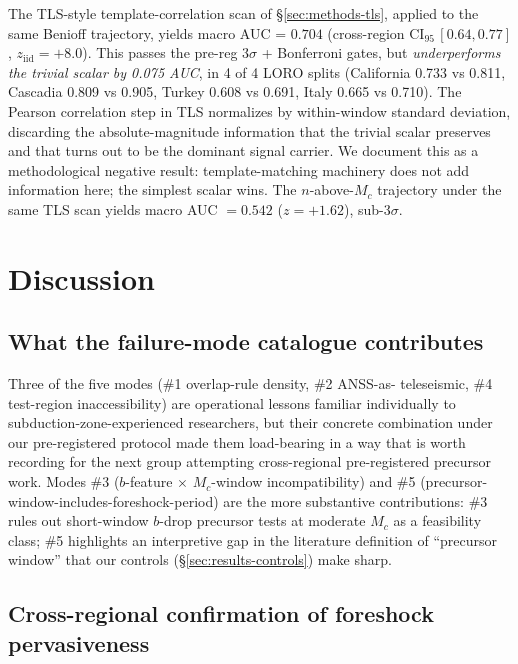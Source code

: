 \documentclass[11pt]{article}
\begin{document}
The TLS-style template-correlation scan of \S\ref{sec:methods-tls},
applied to the same Benioff trajectory, yields macro AUC = $0.704$
(cross-region $\mathrm{CI}_{95}\,[0.64, 0.77]$, $z_\mathrm{iid} =
+8.0$). This passes the pre-reg 3$\sigma$ + Bonferroni gates, but
\emph{underperforms the trivial scalar by 0.075 AUC}, in 4 of 4 LORO
splits (California 0.733 vs 0.811, Cascadia 0.809 vs 0.905, Turkey
0.608 vs 0.691, Italy 0.665 vs 0.710). The Pearson correlation step in
TLS normalizes by within-window standard deviation, discarding the
absolute-magnitude information that the trivial scalar preserves and
that turns out to be the dominant signal carrier. We document this as
a methodological negative result: template-matching machinery does not
add information here; the simplest scalar wins. The
$n$-above-$M_c$ trajectory under the same TLS scan yields macro AUC
$= 0.542$ ($z = +1.62$), sub-3$\sigma$.

\section{Discussion}
\label{sec:discussion}

\subsection{What the failure-mode catalogue contributes}

Three of the five modes (\#1 overlap-rule density, \#2 ANSS-as-
teleseismic, \#4 test-region inaccessibility) are operational lessons
familiar individually to subduction-zone-experienced researchers, but
their concrete combination under our pre-registered protocol made them
load-bearing in a way that is worth recording for the next group
attempting cross-regional pre-registered precursor work. Modes \#3
(\(b\)-feature $\times$ $M_c$-window incompatibility) and \#5
(precursor-window-includes-foreshock-period) are the more substantive
contributions: \#3 rules out short-window $b$-drop precursor tests at
moderate $M_c$ as a feasibility class; \#5 highlights an interpretive
gap in the literature definition of ``precursor window'' that our
controls (\S\ref{sec:results-controls}) make sharp.

\subsection{Cross-regional confirmation of foreshock pervasiveness}
\end{document}
